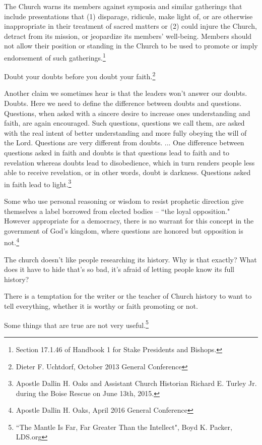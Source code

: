 \begin{displayquote}
The Church warns its members against symposia and similar gatherings that include
presentations that (1) disparage, ridicule, make light of, or are otherwise
inappropriate in their treatment of sacred matters or (2) could injure the Church,
detract from its mission, or jeopardize its members' well-being. Members should not
allow their position or standing in the Church to be used to promote or imply
endorsement of such gatherings.\footnote{Section 17.1.46 of Handbook 1 for Stake 
Presidents and Bishops.}
\end{displayquote}

\begin{displayquote}
Doubt your doubts before you doubt your faith.\footnote{Dieter F. Uchtdorf, 
October 2013 General Conference}
\end{displayquote}

\begin{displayquote}
Another claim we sometimes hear is that the leaders won't answer our doubts. Doubts.
Here we need to define the difference between doubts and questions. Questions, when
asked with a sincere desire to increase ones understanding and faith, are again
encouraged. Such questions, questions we call them, are asked with the real intent of
better understanding and more fully obeying the will of the Lord. Questions are very
different from doubts. ... One difference between questions asked in faith and doubts
is that questions lead to faith and to revelation whereas doubts lead to
disobedience, which in turn renders people less able to receive revelation, or in
other words, doubt is darkness. Questions asked in faith lead to light.\footnote{
Apostle Dallin H. Oaks and Assistant Church Historian Richard E. Turley Jr. 
during the Boise Rescue on June 13th, 2015.
}
\end{displayquote}

\begin{displayquote}
Some who use personal reasoning or wisdom to resist prophetic direction give
themselves a label borrowed from elected bodies -- ``the loyal opposition." However
appropriate for a democracy, there is no warrant for this concept in the government
of God's kingdom, where questions are honored but opposition is not.\footnote{
Apostle Dallin H. Oaks, April 2016 General Conference
}
\end{displayquote}

The church doesn't like people researching its history. Why is that exactly? What
does it have to hide that's so bad, it's afraid of letting people know its full
history?

\begin{displayquote}
There is a temptation for the writer or the teacher of Church history to want to tell 
everything, whether it is worthy or faith promoting or not.

Some things that are true are not very useful.\footnote{``The Mantle Is Far, Far 
Greater Than the Intellect", Boyd K. Packer, LDS.org}
\end{displayquote}